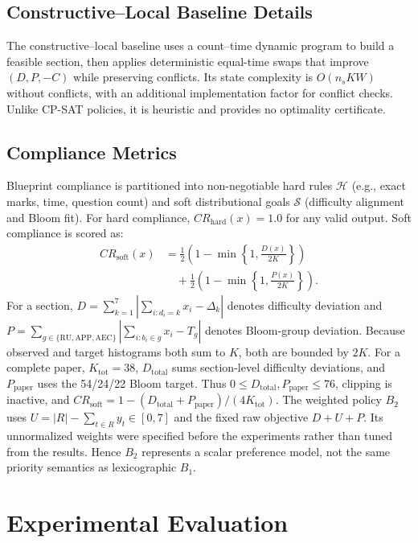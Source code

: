 \documentclass[runningheads]{llncs}
\begin{document}
\subsection{Constructive--Local Baseline Details}
The constructive--local baseline uses a count--time dynamic program to build a feasible section, then applies deterministic equal-time swaps that improve $(D,P,-C)$ while preserving conflicts. Its state complexity is $O(n_sKW)$ without conflicts, with an additional implementation factor for conflict checks. Unlike CP-SAT policies, it is heuristic and provides no optimality certificate.
\subsection{Compliance Metrics}
Blueprint compliance is partitioned into non-negotiable hard rules $\mathcal{H}$ (e.g., exact marks, time, question count) and soft distributional goals $\mathcal{S}$ (difficulty alignment and Bloom fit). For hard compliance, $CR_{\mathrm{hard}}(x) = 1.0$ for any valid output. Soft compliance is scored as:
\begin{equation}
\begin{aligned}
CR_{\mathrm{soft}}(x) &= \frac{1}{2}\left(1-\min\left\{1,\frac{D(x)}{2K}\right\}\right) \\
&\quad + \frac{1}{2}\left(1-\min\left\{1,\frac{P(x)}{2K}\right\}\right).
\end{aligned}
\end{equation}
For a section, $D=\sum_{k=1}^{7}|\sum_{i:d_i=k}x_i-\Delta_k|$ denotes difficulty deviation and $P=\sum_{g\in\{\mathrm{RU,APP,AEC}\}}|\sum_{i:b_i\in g}x_i-T_g|$ denotes Bloom-group deviation. Because observed and target histograms both sum to $K$, both are bounded by $2K$.
For a complete paper, $K_{\mathrm{tot}}=38$, $D_{\mathrm{total}}$ sums section-level difficulty deviations, and $P_{\mathrm{paper}}$ uses the 54/24/22 Bloom target. Thus $0\leq D_{\mathrm{total}},P_{\mathrm{paper}}\leq76$, clipping is inactive, and $CR_{\mathrm{soft}}=1-(D_{\mathrm{total}}+P_{\mathrm{paper}})/(4K_{\mathrm{tot}})$.
The weighted policy $B_2$ uses $U=|R|-\sum_{t\in R}y_t\in[0,7]$ and the fixed raw objective $D+U+P$. Its unnormalized weights were specified before the experiments rather than tuned from the results. Hence $B_2$ represents a scalar preference model, not the same priority semantics as lexicographic $B_1$.
\section{Experimental Evaluation}
\label{sec:experiments}
\end{document}
